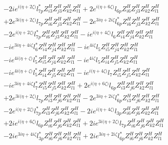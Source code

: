 \begin{align}
 &-2 i e^{i \Big(\eta +2 \zeta \Big)} l_{7p}^* Z_{{i 3}}^{H} Z_{{j 3}}^{H} Z_{{k 2}}^{H} Z_{{l 1}}^{H} +2 e^{i \Big(\eta +6 \zeta \Big)} l_{6p} Z_{{i 6}}^{H} Z_{{j 3}}^{H} Z_{{k 2}}^{H} Z_{{l 1}}^{H} \nonumber \\ 
 &+2 e^{3 i \Big(\eta +2 \zeta \Big)} l_{7p} Z_{{i 6}}^{H} Z_{{j 3}}^{H} Z_{{k 2}}^{H} Z_{{l 1}}^{H} -2 e^{3 i \eta +2 i \zeta } l_{6p}^* Z_{{i 6}}^{H} Z_{{j 3}}^{H} Z_{{k 2}}^{H} Z_{{l 1}}^{H} \nonumber \\ 
 &-2 e^{i \Big(\eta +2 \zeta \Big)} l_{7p}^* Z_{{i 6}}^{H} Z_{{j 3}}^{H} Z_{{k 2}}^{H} Z_{{l 1}}^{H} -i e^{i \Big(\eta +4 \zeta \Big)} l_6 Z_{{i 4}}^{H} Z_{{j 4}}^{H} Z_{{k 2}}^{H} Z_{{l 1}}^{H} \nonumber \\ 
 &-i e^{3 i \eta +4 i \zeta } l_6^* Z_{{i 4}}^{H} Z_{{j 4}}^{H} Z_{{k 2}}^{H} Z_{{l 1}}^{H} -i e^{4 i \zeta } l_5 Z_{{i 5}}^{H} Z_{{j 4}}^{H} Z_{{k 2}}^{H} Z_{{l 1}}^{H} \nonumber \\ 
 &-i e^{4 i \Big(\eta +\zeta \Big)} l_5^* Z_{{i 5}}^{H} Z_{{j 4}}^{H} Z_{{k 2}}^{H} Z_{{l 1}}^{H} -i e^{4 i \zeta } l_5 Z_{{i 4}}^{H} Z_{{j 5}}^{H} Z_{{k 2}}^{H} Z_{{l 1}}^{H} \nonumber \\ 
 &-i e^{4 i \Big(\eta +\zeta \Big)} l_5^* Z_{{i 4}}^{H} Z_{{j 5}}^{H} Z_{{k 2}}^{H} Z_{{l 1}}^{H} -i e^{i \Big(\eta +4 \zeta \Big)} l_7 Z_{{i 5}}^{H} Z_{{j 5}}^{H} Z_{{k 2}}^{H} Z_{{l 1}}^{H} \nonumber \\ 
 &-i e^{3 i \eta +4 i \zeta } l_7^* Z_{{i 5}}^{H} Z_{{j 5}}^{H} Z_{{k 2}}^{H} Z_{{l 1}}^{H} +2 e^{i \Big(\eta +6 \zeta \Big)} l_{6p} Z_{{i 3}}^{H} Z_{{j 6}}^{H} Z_{{k 2}}^{H} Z_{{l 1}}^{H} \nonumber \\ 
 &+2 e^{3 i \Big(\eta +2 \zeta \Big)} l_{7p} Z_{{i 3}}^{H} Z_{{j 6}}^{H} Z_{{k 2}}^{H} Z_{{l 1}}^{H} -2 e^{3 i \eta +2 i \zeta } l_{6p}^* Z_{{i 3}}^{H} Z_{{j 6}}^{H} Z_{{k 2}}^{H} Z_{{l 1}}^{H} \nonumber \\ 
 &-2 e^{i \Big(\eta +2 \zeta \Big)} l_{7p}^* Z_{{i 3}}^{H} Z_{{j 6}}^{H} Z_{{k 2}}^{H} Z_{{l 1}}^{H} -2 i e^{i \Big(\eta +4 \zeta \Big)} l_{3p} Z_{{i 6}}^{H} Z_{{j 6}}^{H} Z_{{k 2}}^{H} Z_{{l 1}}^{H} \nonumber \\ 
 &+2 i e^{i \Big(\eta +6 \zeta \Big)} l_{6p} Z_{{i 6}}^{H} Z_{{j 6}}^{H} Z_{{k 2}}^{H} Z_{{l 1}}^{H} +2 i e^{3 i \Big(\eta +2 \zeta \Big)} l_{7p} Z_{{i 6}}^{H} Z_{{j 6}}^{H} Z_{{k 2}}^{H} Z_{{l 1}}^{H} \nonumber \\ 
 &-2 i e^{3 i \eta +4 i \zeta } l_{3p}^* Z_{{i 6}}^{H} Z_{{j 6}}^{H} Z_{{k 2}}^{H} Z_{{l 1}}^{H} +2 i e^{3 i \eta +2 i \zeta } l_{6p}^* Z_{{i 6}}^{H} Z_{{j 6}}^{H} Z_{{k 2}}^{H} Z_{{l 1}}^{H} \nonumber \\ 

\end{align}
